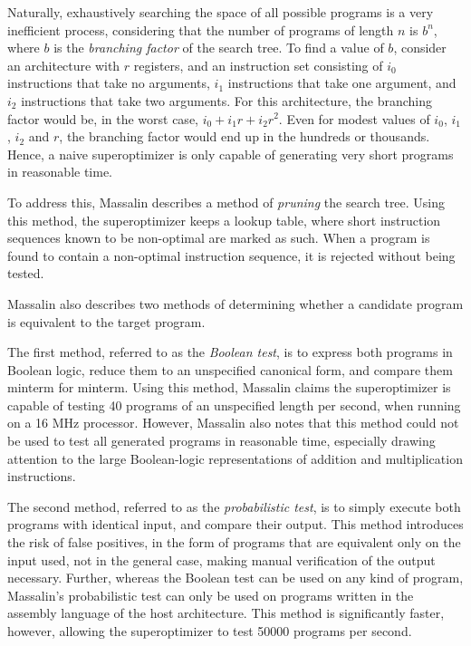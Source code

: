 \documentclass[a4paper,11pt]{kth-mag}
\begin{document}
Naturally, exhaustively searching the space of all possible programs is a very inefficient process, considering that the number of programs of length $n$ is $b^n$, where $b$ is the \emph{branching factor} of the search tree.
To find a value of $b$, consider an architecture with $r$ registers, and an instruction set consisting of $i_0$ instructions that take no arguments, $i_1$ instructions that take one argument, and $i_2$ instructions that take two arguments.
For this architecture, the branching factor would be, in the worst case, $i_0+i_1r+i_2r^2$.
Even for modest values of $i_0$, $i_1$, $i_2$ and $r$, the branching factor would end up in the hundreds or thousands.
Hence, a naive superoptimizer is only capable of generating very short programs in reasonable time.

To address this, Massalin describes a method of \emph{pruning} the search tree.
Using this method, the superoptimizer keeps a lookup table, where short instruction sequences known to be non-optimal are marked as such.
When a program is found to contain a non-optimal instruction sequence, it is rejected without being tested.

Massalin also describes two methods of determining whether a candidate program is equivalent to the target program.

The first method, referred to as the \emph{Boolean test}, is to express both programs in Boolean logic, reduce them to an unspecified canonical form, and compare them minterm for minterm.
Using this method, Massalin claims the superoptimizer is capable of testing 40 programs of an unspecified length per second, when running on a 16 MHz processor.
However, Massalin also notes that this method could not be used to test all generated programs in reasonable time, especially drawing attention to the large Boolean-logic representations of addition and multiplication instructions.

The second method, referred to as the \emph{probabilistic test}, is to simply execute both programs with identical input, and compare their output.
This method introduces the risk of false positives, in the form of programs that are equivalent only on the input used, not in the general case, making manual verification of the output necessary.
Further, whereas the Boolean test can be used on any kind of program, Massalin's probabilistic test can only be used on programs written in the assembly language of the host architecture.
This method is significantly faster, however, allowing the superoptimizer to test 50000 programs per second.
\end{document}
